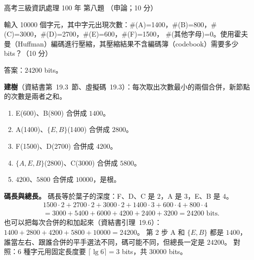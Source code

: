 \begin{pastexam}[label={px:gk3-100-ds-08}]{高考三級資訊處理 100 年 第八題}
（申論；10 分）

輸入 10000 個字元，其中字元出現次數：\#(A)=1400，\#(B)=800，\#(C)=3000，\#(D)=2700，\#(E)=600，\#(F)=1500，
\#(其他字母)=0。使用霍夫曼（Huffman）編碼進行壓縮，其壓縮結果不含編碼簿（codebook）需要多少 bits？（10 分）
\end{pastexam}

\begin{pastsoln}
答案：$24200$ bits。

\textbf{建樹}（資結書第~19.3~節、虛擬碼~19.3）：每次取出次數最小的兩個合併，新節點的次數是兩者之和。
\begin{enumerate}
\item E(600)、B(800) 合併成 $1400$。
\item A(1400)、$\{E,B\}$(1400) 合併成 $2800$。
\item F(1500)、D(2700) 合併成 $4200$。
\item $\{A,E,B\}$(2800)、C(3000) 合併成 $5800$。
\item $4200$、$5800$ 合併成 $10000$，是根。
\end{enumerate}
\begin{center}
\end{center}

\textbf{碼長與總長。} 碼長等於葉子的深度：F、D、C 是 $2$，A 是 $3$，E、B 是 $4$。
\[
\begin{aligned}
&1500 \cdot 2 + 2700 \cdot 2 + 3000 \cdot 2 + 1400 \cdot 3 + 600 \cdot 4 + 800 \cdot 4 \\
&= 3000 + 5400 + 6000 + 4200 + 2400 + 3200 = 24200 \text{ bits}.
\end{aligned}
\]
也可以把每次合併的和加起來（資結書引理~19.6）：$1400 + 2800 + 4200 + 5800 + 10000 = 24200$。 第 2 步
A 和 $\{E,B\}$ 都是 $1400$，誰當左右、跟誰合併的平手選法不同，碼可能不同，但總長一定是 $24200$。
對照：$6$ 種字元用固定長度要 $\lceil \lg 6 \rceil = 3$ bits，共 $30000$ bits。
\end{pastsoln}
